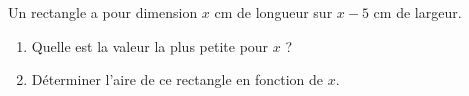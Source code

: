 
Un rectangle a pour dimension $x$ cm de longueur sur $x-5$ cm de largeur. 
\begin{enumerate}
\item Quelle est la valeur la plus petite pour $x$ ?
\item Déterminer l'aire de ce rectangle en fonction de $x$. 
\end{enumerate}